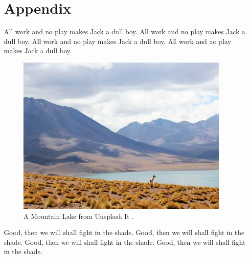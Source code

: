 
%
%

%
%

\section*{Appendix}
\label{sec:appendix}

All work and no play makes Jack a dull boy.
All work and no play makes Jack a dull boy.
All work and no play makes Jack a dull boy.
All work and no play makes Jack a dull boy.

\begin{figure}[h]
\centering
\includegraphics[width=\linewidth,natwidth=400,natheight=300]{../figures/lake.jpg}
\caption{A Mountain Lake from Unsplash It \cite{unsplash}.}
\label{fig:lake}
\end{figure}

Good, then we will shall fight in the shade.
Good, then we will shall fight in the shade.
Good, then we will shall fight in the shade.
Good, then we will shall fight in the shade.
